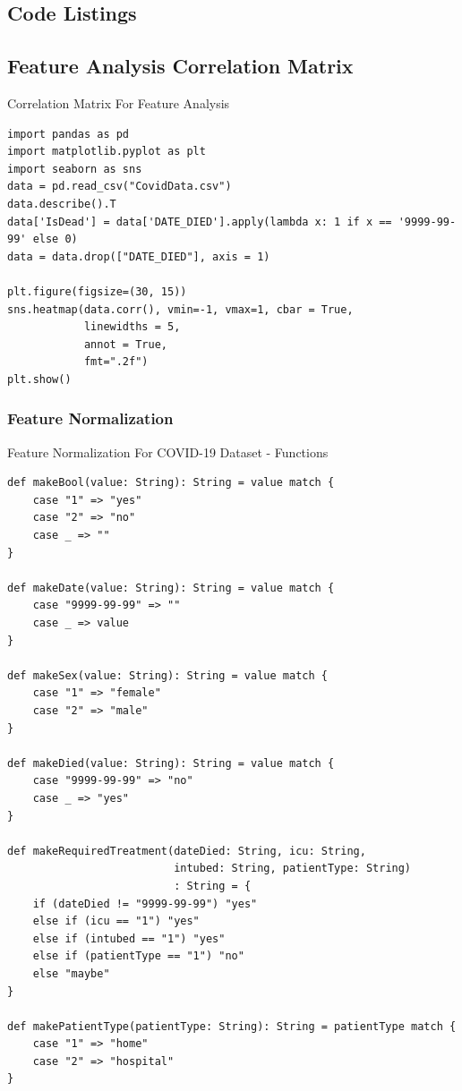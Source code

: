 \subsection{Code Listings}

\subsection{Feature Analysis Correlation Matrix}

\begin{listing}[H]
\caption{Correlation Matrix For Feature Analysis}
\label{lst:corr_matrix}
\begin{verbatim}
import pandas as pd
import matplotlib.pyplot as plt
import seaborn as sns
data = pd.read_csv("CovidData.csv")
data.describe().T
data['IsDead'] = data['DATE_DIED'].apply(lambda x: 1 if x == '9999-99-99' else 0)
data = data.drop(["DATE_DIED"], axis = 1)

plt.figure(figsize=(30, 15))
sns.heatmap(data.corr(), vmin=-1, vmax=1, cbar = True,
            linewidths = 5, 
            annot = True,
            fmt=".2f")
plt.show()
\end{verbatim}
\end{listing}

\subsubsection{Feature Normalization}

\begin{listing}[H]
\caption{Feature Normalization For COVID-19 Dataset - Functions}
\label{lst:feat_norm_functions}
\begin{verbatim}
def makeBool(value: String): String = value match {
    case "1" => "yes"
    case "2" => "no"
    case _ => ""
}

def makeDate(value: String): String = value match {
    case "9999-99-99" => ""
    case _ => value
}

def makeSex(value: String): String = value match {
    case "1" => "female"
    case "2" => "male"
}

def makeDied(value: String): String = value match {
    case "9999-99-99" => "no"
    case _ => "yes"
}

def makeRequiredTreatment(dateDied: String, icu: String, 
                          intubed: String, patientType: String)
                          : String = {
    if (dateDied != "9999-99-99") "yes"
    else if (icu == "1") "yes"
    else if (intubed == "1") "yes"
    else if (patientType == "1") "no"
    else "maybe"
}

def makePatientType(patientType: String): String = patientType match {
    case "1" => "home"
    case "2" => "hospital"
}
\end{verbatim}
\end{listing}

